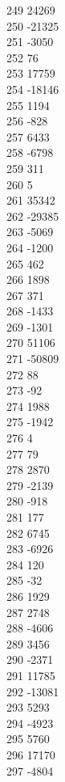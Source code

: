 { 249	24269 \\
 250	-21325 \\
 251	-3050 \\
 252	76 \\
 253	17759 \\
 254	-18146 \\
 255	1194 \\
 256	-828 \\
 257	6433 \\
 258	-6798 \\
 259	311 \\
 260	5 \\
 261	35342 \\
 262	-29385 \\
 263	-5069 \\
 264	-1200 \\
 265	462 \\
 266	1898 \\
 267	371 \\
 268	-1433 \\
 269	-1301 \\
 270	51106 \\
 271	-50809 \\
 272	88 \\
 273	-92 \\
 274	1988 \\
 275	-1942 \\
 276	4 \\
 277	79 \\
 278	2870 \\
 279	-2139 \\
 280	-918 \\
 281	177 \\
 282	6745 \\
 283	-6926 \\
 284	120 \\
 285	-32 \\
 286	1929 \\
 287	2748 \\
 288	-4606 \\
 289	3456 \\
 290	-2371 \\
 291	11785 \\
 292	-13081 \\
 293	5293 \\
 294	-4923 \\
 295	5760 \\
 296	17170 \\
 297	-4804 \\
}
